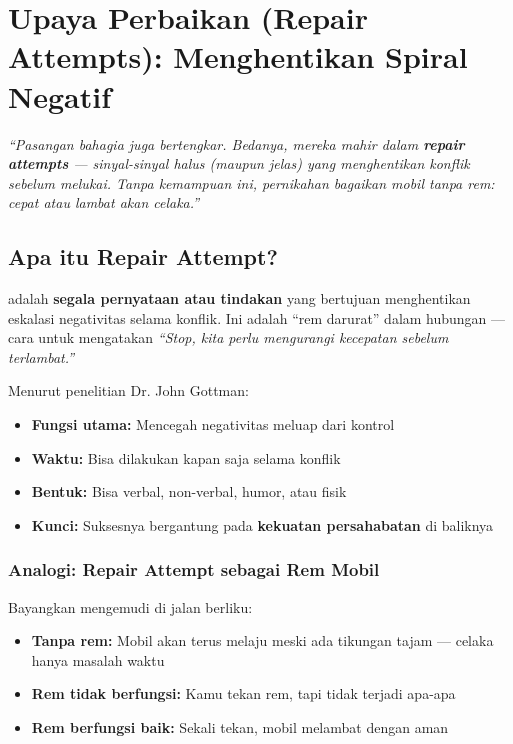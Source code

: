 \chapter{Upaya Perbaikan (Repair Attempts): Menghentikan Spiral Negatif}

\begin{insightbox}
\textit{``Pasangan bahagia juga bertengkar. Bedanya, mereka mahir dalam \textbf{repair attempts} --- sinyal-sinyal halus (maupun jelas) yang menghentikan konflik sebelum melukai. Tanpa kemampuan ini, pernikahan bagaikan mobil tanpa rem: cepat atau lambat akan celaka.''}
\end{insightbox}

\section{Apa itu Repair Attempt?}

 adalah \textbf{segala pernyataan atau tindakan} yang bertujuan menghentikan eskalasi negativitas selama konflik. Ini adalah ``rem darurat'' dalam hubungan --- cara untuk mengatakan \textit{``Stop, kita perlu mengurangi kecepatan sebelum terlambat.''}

\begin{praktikbox}
Menurut penelitian Dr. John Gottman:
\begin{itemize}
    \item \textbf{Fungsi utama:} Mencegah negativitas meluap dari kontrol
    \item \textbf{Waktu:} Bisa dilakukan kapan saja selama konflik
    \item \textbf{Bentuk:} Bisa verbal, non-verbal, humor, atau fisik
    \item \textbf{Kunci:} Suksesnya bergantung pada \textbf{kekuatan persahabatan} di baliknya
\end{itemize}
\end{praktikbox}

\subsection{Analogi: Repair Attempt sebagai Rem Mobil}

Bayangkan mengemudi di jalan berliku:
\begin{itemize}
    \item \textbf{Tanpa rem:} Mobil akan terus melaju meski ada tikungan tajam --- celaka hanya masalah waktu
    \item \textbf{Rem tidak berfungsi:} Kamu tekan rem, tapi tidak terjadi apa-apa
    \item \textbf{Rem berfungsi baik:} Sekali tekan, mobil melambat dengan aman
\end{itemize}

